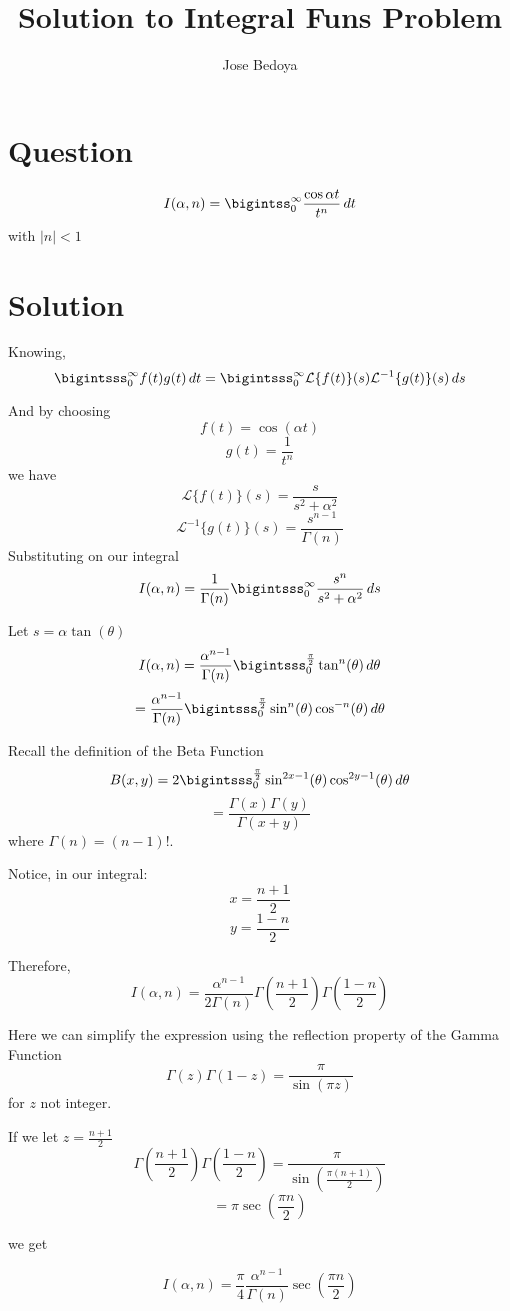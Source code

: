 \documentclass{article}
\begin{document}
\pagecolor{Blue}
\title{Solution to Integral Fun\textsc{}s Problem}
\author{Jose Bedoya}
\maketitle
\section{Question}
{\LARGE
$$I(\alpha,n)=\bigintss_{0}^{\infty} \frac{\cos \alpha t}{t^n}\,dt$$
with $\mid n \mid<1$
}
\section{Solution}
{\Large
Knowing,
$$\bigintsss_{0}^{\infty}f(t)g(t)\,dt=\bigintsss_{0}^{\infty}\mathcal{L}\{f(t)\}(s)\mathcal{L}^{-1}\{g(t)\}(s)\,ds$$

\vspace{5mm}
And by choosing
$$f(t)=\cos(\alpha t)$$
$$g(t)=\frac{1}{t^n}$$
we have
$$\mathcal{L}\{f(t)\}(s)=\frac{s}{s^2+\alpha^2}$$
$$\mathcal{L}^{-1}\{g(t)\}(s)=\frac{s^{n-1}}{\Gamma(n)}$$
\newpage
Substituting on our integral
$$I(\alpha,n)=\frac{1}{\Gamma(n)}\bigintsss_{0}^{\infty}\frac{s^n}{s^2+\alpha^2}\,ds$$

\vspace{3mm}
Let $s=\alpha\tan(\theta)$
$$I(\alpha,n)=\frac{\alpha^{n-1}}{\Gamma(n)}\bigintsss_{0}^{\frac{\pi}{2}}\tan^n(\theta)\,d\theta$$
$$=\frac{\alpha^{n-1}}{\Gamma(n)}\bigintsss_{0}^{\frac{\pi}{2}}\sin^n(\theta)\cos^{-n}(\theta)\,d\theta$$

\vspace{5mm}
Recall the definition of the Beta Function
$$B(x,y)=2\bigintsss_{0}^{\frac{\pi}{2}}\sin^{2x-1}(\theta)\cos^{2y-1}(\theta)\,d\theta$$
$$=\frac{\Gamma(x)\Gamma(y)}{\Gamma(x+y)}$$
where $\Gamma(n)=(n-1)$!.

\vspace{5mm}
Notice, in our integral:
$$x=\frac{n+1}{2}$$
$$y=\frac{1-n}{2}$$

\vspace{3mm}
Therefore,
$$I(\alpha,n)=\frac{\alpha^{n-1}}{2\Gamma(n)}\Gamma\left(\frac{n+1}{2}\right)\Gamma\left(\frac{1-n}{2}\right)$$

\vspace{3mm}
Here we can simplify the expression using the reflection property of the Gamma Function
$$\Gamma(z)\Gamma(1-z)=\frac{\pi}{\sin(\pi z)}$$
for $z$ not integer.

\vspace{3mm}
If we let $z=\frac{n+1}{2}$
$$\Gamma\left(\frac{n+1}{2}\right)\Gamma\left(\frac{1-n}{2}\right)=\frac{\pi}{\sin\left(\frac{\pi(n+1)}{2}\right)}$$
$$=\pi\sec\left(\frac{\pi n}{2}\right)$$

\vspace{2mm}
we get
}
{\LARGE
$$I(\alpha,n)=\frac{\pi}{4}\frac{\alpha^{n-1}}{\Gamma(n)}\sec\left(\frac{\pi n}{2}\right)$$
}
\end{document}
